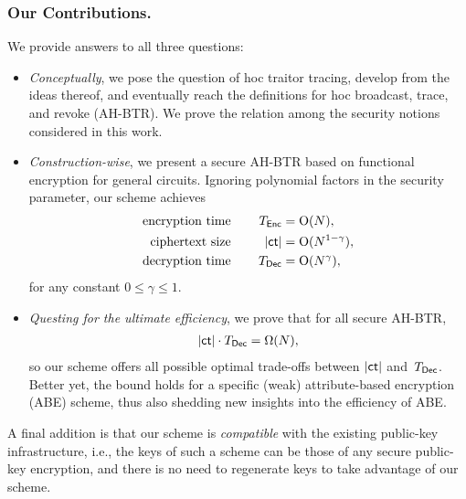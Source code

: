 \subsubsection{Our Contributions.}
We provide answers to all three questions:
\begin{itemize}
\item \emph{Conceptually}, we pose the question of \ad hoc traitor tracing,
develop from the ideas thereof, and
eventually reach the definitions for \ad hoc broadcast, trace, and revoke (AH-BTR).
We prove the relation among the security notions considered in this work.
\item \emph{Construction-wise},
we present a secure AH-BTR based on functional encryption for general circuits.
Ignoring polynomial factors in the security parameter,
our scheme achieves
\begin{align*}
\textup{encryption time}\qquad\qquad\mathllap{T_\Enc}&{}=\bigO(N),\\
\textup{ciphertext size}\qquad\qquad\mathllap{|\ct|}&{}=\bigO(N^{1-\gamma}),\\
\textup{decryption time}\qquad\qquad\mathllap{T_\Dec}&{}=\bigO(N^\gamma),
\end{align*}
for any constant ${0\leq\gamma\leq 1}$.
\item \emph{Questing for the ultimate efficiency},
we prove that for all secure AH-BTR,
\begin{align*}
|\ct|\cdot\TDec=\bigOmega(N),
\end{align*}
so our scheme offers all possible optimal trade-offs between $|\ct|$ and~$\TDec$.
Better yet, the bound holds for a specific (weak) attribute-based encryption (ABE) scheme, thus also shedding new insights into the efficiency of ABE.
\end{itemize}
A final addition is that our scheme is \emph{compatible} with the existing public-key infrastructure,
i.e., the keys of such a scheme can be those of any secure public-key encryption, and
there is no need to regenerate keys to take advantage of our scheme.
